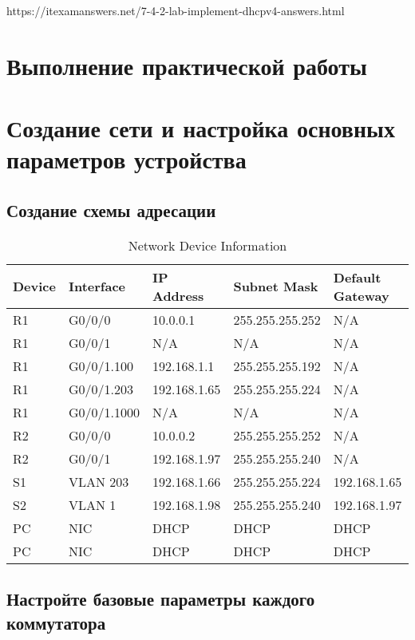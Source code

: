 https://itexamanswers.net/7-4-2-lab-implement-dhcpv4-answers.html

\section{Выполнение практической работы}

\section{Создание сети и настройка основных параметров устройства}

\subsection{Создание схемы адресации}

\begin{table}[htbp]
	\centering
	\caption{Network Device Information}
	\label{tab:network_devices}
	\begin{tabular}{|l|l|l|l|l|}
		\hline
		\textbf{Device} & \textbf{Interface} & \textbf{IP Address}
			& \textbf{Subnet Mask} & \textbf{Default Gateway} \\ \hline
		R1 & G0/0/0 & 10.0.0.1 & 255.255.255.252 & N/A \\ \hline
		R1 & G0/0/1 & N/A & N/A & N/A \\ \hline
		R1 & G0/0/1.100 & 192.168.1.1 & 255.255.255.192 & N/A \\ \hline
		R1 & G0/0/1.203 & 192.168.1.65 & 255.255.255.224 & N/A \\ \hline
		R1 & G0/0/1.1000 & N/A & N/A & N/A \\ \hline
		R2 & G0/0/0 & 10.0.0.2 & 255.255.255.252 & N/A \\ \hline
		R2 & G0/0/1 & 192.168.1.97 & 255.255.255.240 & N/A \\ \hline
		S1 & VLAN 203 & 192.168.1.66 & 255.255.255.224 & 192.168.1.65 \\ \hline
		S2 & VLAN 1 & 192.168.1.98 & 255.255.255.240 & 192.168.1.97 \\ \hline
		PC & NIC & DHCP & DHCP & DHCP \\ \hline
		PC & NIC & DHCP & DHCP & DHCP \\ \hline
	\end{tabular}
\end{table}

\subsection{Настройте базовые параметры каждого коммутатора}

